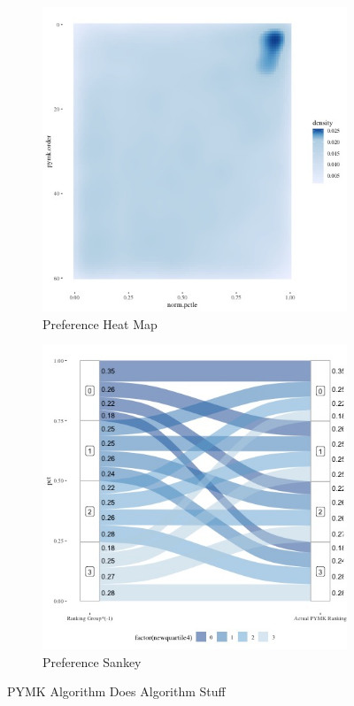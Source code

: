 \documentclass[12pt,letterpaper]{article}
\begin{document}
\begin{figure}[ht]
   \begin{subfigure}{.5\textwidth} 
        \centering
        \includegraphics[width=1\linewidth]{Output/Graphs/Audit/Heatmaps/US PYMK norm pref rank by pymk rank - smooth.jpg}  
        \caption{Preference Heat Map}
        \label{fig:sub-first}
        \end{subfigure}
    \begin{subfigure}{.5\textwidth}
        \centering
        \includegraphics[width=1\linewidth]{Output/Graphs/Audit/Sankey flows/US PYMK norm quartile to actual.jpg}  
        \caption{Preference Sankey}
        \label{fig:sub-second}
    \end{subfigure}
    
\caption{PYMK Algorithm Does Algorithm Stuff}
\end{figure}
\end{document}
